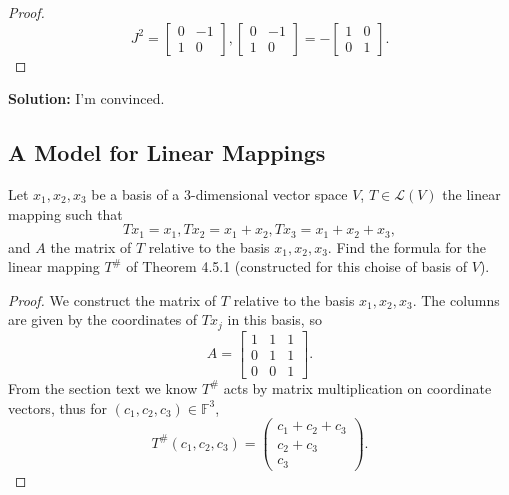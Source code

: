 \begin{proof}
    \[
    J^2 = 
    \begin{bmatrix}
        0 & -1 \\ 1 & 0
    \end{bmatrix},
    \begin{bmatrix}
        0 & -1 \\ 1 & 0
    \end{bmatrix}
    = 
    -\begin{bmatrix}
        1 & 0 \\ 0 & 1
    \end{bmatrix}.
    \]
\end{proof}

\textbf{Solution: } I'm convinced.

\subsection{A Model for Linear Mappings}


\begin{tcolorbox}[title=Exercise 1, breakable]
    Let $x_1, x_2, x_3$ be a basis of a 
    $3$-dimensional vector space $V$,
    $T \in \mathcal{L}(V)$ the linear mapping 
    such that 
    \[T x_1 = x_1, T x_2 = x_1 + x_2, T x_3 = x_1 + x_2 + x_3,\]
    and $A$ the matrix of $T$ relative to the basis $x_1, x_2, x_3$.
    Find the formula for the linear mapping $T^{\#}$ of Theorem 4.5.1
    (constructed for this choise of basis of $V$).
\end{tcolorbox}

\begin{proof}
    We construct the matrix of $T$ relative to the basis $x_1, x_2, x_3$.
    The columns are given by the coordinates of $T x_j$ in this basis, so
    \[
    A = 
    \begin{bmatrix}
    1 & 1 & 1 \\
    0 & 1 & 1 \\
    0 & 0 & 1
    \end{bmatrix}.
    \]
    From the section text we know $T^{\#}$ acts by matrix multiplication on
    coordinate vectors, thus for $(c_1,c_2,c_3)\in \mathbb{F}^3$,
    \[
    T^{\#}(c_1,c_2,c_3)
    =
    \begin{pmatrix}
    c_1 + c_2 + c_3 \\
    c_2 + c_3 \\
    c_3
    \end{pmatrix}.
    \]
\end{proof}


